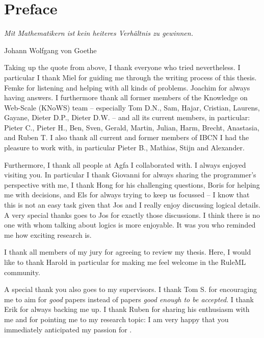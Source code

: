 \cleardoublepage

\normalsize

\chapter{Preface}
\setlength{\epigraphrule}{0pt}
\setlength{\epigraphwidth}{0.75\textwidth}
\epigraph{\textit{Mit Mathematikern ist kein heiteres Verhältnis zu gewinnen.}}{Johann Wolfgang von Goethe}




Taking up the quote from above, I thank everyone who tried nevertheless.
I particular I thank Miel for guiding me through the writing process of this thesis. Femke for listening and helping with all kinds of problems. 
Joachim for always having answers.
I furthermore thank all former members of the Knowledge on Web-Scale (KNoWS) team -- especially Tom D.N., Sam, Hajar, Cristian, Laurens, Gayane, Dieter D.P., Dieter D.W. --
and all its current members, in particular:
Pieter C.,
Pieter H.,
Ben, Sven, Gerald, Martin, Julian, Harm, Brecht, Anastasia, and Ruben T.  
I also thank  all current and former members of IBCN I had the pleasure to work with, in particular Pieter B., Mathias, Stijn and Alexander.

Furthermore, I thank all people at Agfa I collaborated with. I always enjoyed visiting you. In particular I thank Giovanni for always sharing the programmer's perspective with me,
I thank Hong  for his challenging questions, Boris for helping me with decisions, and Els for always trying to keep us focussed -- I know that this is not an easy 
task given that Jos and I really enjoy discussing logical details. 
A very special thanks goes to Jos for exactly those discussions. I think there is no one with whom talking about logics is more enjoyable.
It was you who reminded me how exciting research is.

I thank all members of my jury for agreeing to review my thesis. Here, I would like to thank Harold in particular for making me feel welcome in the RuleML community.
 
A special thank you also goes to my supervisors.
I thank Tom S. for encouraging me to aim for \emph{good} papers instead of papers \emph{good enough to be accepted}.
I thank Erik for always backing me up. I thank Ruben for sharing his enthusiasm with me and for pointing me to my research topic:
I am very happy that you immediately anticipated my passion for \nthreelogic.  


